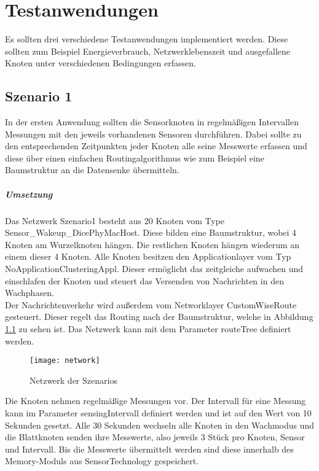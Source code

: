 \chapter{Testanwendungen}
Es sollten drei verschiedene Testanwendungen implementiert werden. Diese sollten zum Beispiel Energieverbrauch, Netzwerklebenszeit und ausgefallene Knoten unter verschiedenen Bedingungen erfassen.\\
\section{Szenario 1}
In der ersten Anwendung sollten die Sensorknoten in regelmäßigen Intervallen Messungen mit den jeweils vorhandenen Sensoren durchführen. Dabei sollte zu den entsprechenden Zeitpunkten jeder Knoten alle seine Messwerte erfassen und diese über einen einfachen Routingalgorithmus wie zum Beispiel eine Baumstruktur an die Datensenke übermitteln.
\paragraph{Umsetzung}
Das Netzwerk Szenario1 besteht aus 20 Knoten vom Type \\Sensor\_Wakeup\_DicePhyMacHost. Diese bilden eine Baumstruktur, wobei 4 Knoten am Wurzelknoten hängen. Die restlichen Knoten hängen wiederum an einem dieser 4 Knoten. Alle Knoten besitzen den Applicationlayer vom Typ NoApplicationClusteringAppl. Dieser ermöglicht das zeitgleiche aufwachen und einschlafen der Knoten und steuert das Versenden von Nachrichten in den Wachphasen. \\
Der Nachrichtenverkehr wird außerdem vom Networklayer CustomWiseRoute gesteuert. Dieser regelt das Routing nach der Baumstruktur, welche in Abbildung \ref{fig:nwds} zu sehen ist. Das Netzwerk kann mit dem Parameter routeTree definiert werden.

\begin{figure}[htbp]
\centering
\caption{Netzwerk der Szenarios}
\label{fig:nwds}
\texttt{[image: network]}
\end{figure}

Die Knoten nehmen regelmäßige Messungen vor. Der Intervall für eine Messung kann im Parameter sensingIntervall definiert werden und ist auf den Wert von 10 Sekunden gesetzt. Alle 30 Sekunden wechseln alle Knoten in den Wachmodus und die Blattknoten senden ihre Messwerte, also jeweils 3 Stück pro Knoten, Sensor und Intervall. Bis die Messwerte übermittelt werden sind diese innerhalb des Memory-Moduls aus SensorTechnology gespeichert.

